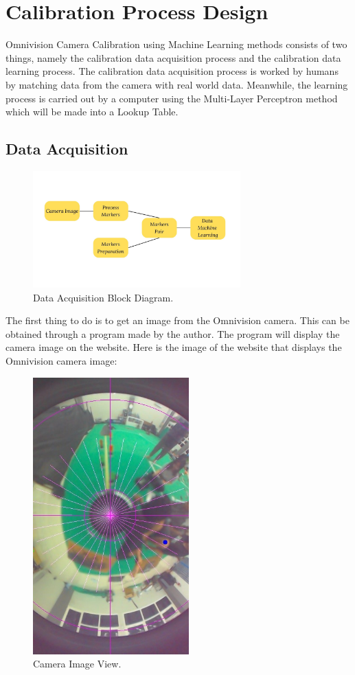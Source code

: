 \section{Calibration Process Design}
\label{sec:desaindanimplementasi1}

Omnivision Camera Calibration using Machine Learning methods consists of two things, namely the calibration data acquisition process and the calibration data learning process. The calibration data acquisition process is worked by humans by matching data from the camera with real world data. Meanwhile, the learning process is carried out by a computer using the Multi-Layer Perceptron method which will be made into a Lookup Table.

\subsection{Data Acquisition}
\label{sec:deskripsisistem}

\begin{figure}[H]
  \centering
  \includegraphics[width=8cm]{gambar/anu2.jpg}
  \caption{Data Acquisition Block Diagram.}
  \label{fig:diag31}
\end{figure}

The first thing to do is to get an image from the Omnivision camera. This can be obtained through a program made by the author. The program will display the camera image on the website. Here is the image of the website that displays the Omnivision camera image: 

\begin{figure}[H]
  \centering
  \includegraphics[width=6cm]{gambar/iris_web.jpeg}
  \caption{Camera Image View.}
  \label{fig:diag310}
\end{figure}

